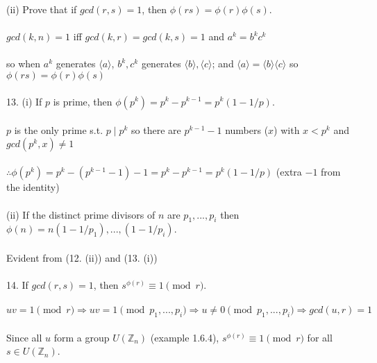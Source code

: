 \documentclass{article}
\begin{document}
\begin{siderules}
\color{blue}(ii) Prove that if \(gcd(r,s)=1\), then \(\phi(rs)=\phi(r)\phi(s)\).\\\\\color{black}
\null\qquad \(gcd(k,n)=1\) iff \(gcd(k,r)=gcd(k,s)=1\) and \(a^{k}=b^{k}c^{k}\) \\\\
\null\qquad so when \(a^{k}\) generates \(\langle a\rangle\), \(b^{k}, c^{k}\) generates \(\langle b\rangle,\langle c\rangle\); and \(\langle a\rangle=\langle b\rangle\langle c\rangle\) so \(\phi(rs)=\phi(r)\phi(s)\)\\\\
\color{blue}13. (i) If \(p\) is prime, then \(\phi(p^{k})=p^{k}-p^{k-1}=p^{k}(1-1/p)\).\\\\\color{black}
\null\qquad \(p\) is the only prime s.t. \(p\;|\;p^{k}\) so there are \(p^{k-1}-1\) numbers (\(x\)) with \(x<p^{k}\) and \(gcd(p^{k},x)\neq 1\)\\\\
\null\qquad \(\therefore \phi(p^{k})=p^{k}-(p^{k-1}-1)-1=p^{k}-p^{k-1}=p^{k}(1-1/p)\) (extra \(-1\) from the identity)\\\\
\color{blue}(ii) If the distinct prime divisors of \(n\) are \(p_{1},...,p_{i}\) then \(\phi(n)=n(1-1/p_{1}),...,(1-1/p_{i})\).\\\\\color{black}
\null\qquad Evident from \color{gray}(12. (ii)) \color{black} and \color{gray}(13. (i))\color{black}\\\\
\color{blue}14. If \(gcd(r,s)=1\), then \(s^{\phi(r)}\equiv 1\pmod r\).\\\\\color{black}
\null\qquad \(uv=1\pmod r\Longrightarrow uv=1\pmod{p_{1},...,p_{i}}\Longrightarrow u\neq 0\pmod{p_{1},...,p_{i}}\Longrightarrow gcd(u,r)=1\)\\\\
\null\qquad Since all \(u\) form a group \(U(\mathbb{Z}_{n})\) \color{gray}(example 1.6.4)\color{black}, \(s^{\phi(r)}\equiv 1\pmod r\) for all \(s\in U(\mathbb{Z}_{n})\).
\end{siderules}
\end{document}
